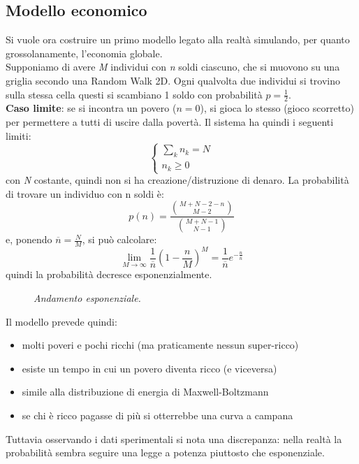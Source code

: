 \documentclass[12pt, a4paper]{book}
\theoremstyle{theorem}
\begin{document}
			\subsection{Modello economico}
				Si vuole ora costruire un primo modello legato alla realtà simulando, per quanto grossolanamente, l'economia globale.\\
				Supponiamo di avere \textit{M} individui con \textit{n} soldi ciascuno, che si muovono su una griglia secondo una Random Walk 2D.
				Ogni qualvolta due individui si trovino sulla stessa cella questi si scambiano 1 soldo con probabilità $p=\frac{1}{2}$.\\
				\textbf{Caso limite}: se si incontra un povero ($n=0$), si gioca lo stesso (gioco scorretto) per permettere a tutti di uscire dalla povertà.
				Il sistema ha quindi i seguenti limiti:
				\begin{equation*}
					\begin{cases}
						\sum_kn_k=N\\
						n_k\geq 0
					\end{cases}
				\end{equation*}
				con \textit{N} costante, quindi non si ha creazione/distruzione di denaro.
				La probabilità di trovare un individuo con n soldi è:
				\begin{equation*}
					p(n)=\frac{\binom{M+N-2-n}{M-2}}{\binom{M+N-1}{N-1}}
				\end{equation*}
				e, ponendo $\overline{n}=\frac{N}{M}$, si può calcolare:
				\begin{equation}
					\lim_{M\to\infty}\frac{1}{\overline{n}}\left( 1-\frac{n}{M}\right)^M=\frac{1}{\overline{n}}e^{-\frac{n}{\bar{n}}}
				\end{equation}
				quindi la probabilità decresce esponenzialmente.\\
				\begin{figure}[H]
					\centering
					\caption{\emph{Andamento esponenziale.}}
					\label{figure:modello_economico}
				\end{figure}
				Il modello prevede quindi:
				\begin{itemize}
					\item molti poveri e pochi ricchi (ma praticamente nessun super-ricco)
					\item esiste un tempo in cui un povero diventa ricco (e viceversa)
					\item simile alla distribuzione di energia di Maxwell-Boltzmann
					\item se chi è ricco pagasse di più si otterrebbe una curva a campana
				\end{itemize}
				Tuttavia osservando i dati sperimentali si nota una discrepanza: nella realtà la probabilità sembra seguire una legge a potenza piuttosto che esponenziale.
\end{document}

